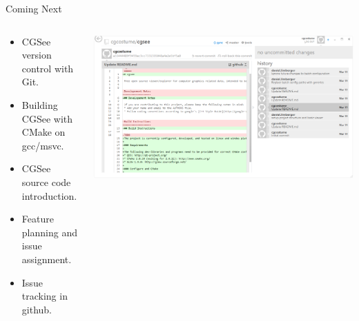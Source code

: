 
\begin{frame}[plain]
\end{frame}


\begin{frame}{Coming Next}

	\begin{columns}
		\begin{column}{0.5\textwidth}

			\begin{itemize}
				\item CGSee version control with Git.
				\item Building CGSee with CMake on gcc/msvc.
				\item CGSee source code introduction.
				\item Feature planning and issue assignment.
				\item Issue tracking in github.
			\end{itemize}

		\end{column}
		\begin{column}{0.5\textwidth}

			\includegraphics[width=\textwidth]{intro/githubwin}
			
		\end{column}
	\end{columns}

\end{frame}


